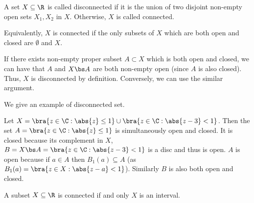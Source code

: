 \begin{definition}\label{def:connected_set_real_space}
A set $X\subseteq \R$ is called disconnected if it is the union of two disjoint non-empty open sets $X_1,X_2$ in $X$. Otherwise, $X$ is called connected.
\end{definition}

\begin{remark}
Equivalently, $X$ is connected if the only subsets of $X$ which are both open and closed are $\emptyset$ and $X$.

If there exists non-empty proper subset $A\subset X$ which is both open and closed, we can have that $A$ and $X \bs A$ are both non-empty open (since $A$ is also closed). Thus, $X$ is disconnected by definition. Conversely, we can use the similar argument.
\end{remark}


We give an example of disconnected set.

\begin{example}
Let $X = \bra{z\in \C:\abs{z}\leq 1}\cup \bra{z\in\C: \abs{z-3}<1}$. Then the set $A = \bra{z\in \C:\abs{z}\leq 1}$ is simultaneously open and closed. It is closed because its complement in $X$, $B = X\bs A = \bra{z\in \C:\abs{z-3}<1}$ is a disc and thus is open. $A$ is open because if $a\in A$ then $B_1(a)\subseteq A$ (as $B_1(a) = \bra{z\in X:\abs{z-a} <1}$). Similarly $B$ is also both open and closed.
\end{example}



\begin{theorem}\label{thm:real_subset_connected_iff_interval}
A subset $X\subseteq \R$ is connected if and only $X$ is an interval. %
\end{theorem}

